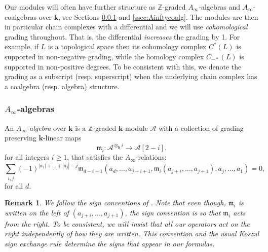 \documentclass{gtpart}
\newtheorem{rem}[thm]{Remark}
\renewcommand{\k}{\mathbf{k}}
\newcommand{\m}{\mathfrak{m}}
\newcommand{\A}{\mathscr{A}}
\renewcommand{\Z}{\mathbb{Z}}
\begin{document}
Our modules will often have further structure as $\Z$-graded $A_\infty$-algebras and $A_\infty$-coalgebras over $\k$, see Sections \ref{ssec:Ainftyalg} and \ref{ssec:Ainftycoalg}. The modules are then in particular chain complexes with a differential and we will use \emph{cohomological} grading throughout. That is, the differential \emph{increases} the grading by 1. For
example, if $L$ is a topological space then its cohomology complex $C^*(L)$ is supported in
non-negative grading, while the homology complex $C_{-*}(L)$ is supported in non-positive degrees.
To be consistent with this, we denote the grading as a subscript (resp. superscript) when the underlying chain
complex has a coalgebra (resp. algebra) structure. 


\subsubsection{$A_{\infty}$-algebras}\label{ssec:Ainftyalg} An \emph{$A_\infty$-algebra} over $\k$
is a $\Z$-graded $\k$-module $\A$ with a collection of grading preserving $\k$-linear maps \[ \m_i
\colon \A^{\otimes_\k i } \to \A [2-i],  \] for all integers $i \geq 1$, that satisfies the
$A_\infty$-relations: \begin{equation} \label{ainf} \sum_{i,j} (-1)^{|a_1|+\ldots + |a_j|-j}
\m_{d-i+1}\left(a_d,\ldots, a_{j+i+1},\m_i(a_{j+i},\ldots, a_{j+1}), a_j,\ldots, a_1\right) = 0,
\end{equation} for all $d$. 

\begin{rem}\label{rem:Seidelsign}
	We follow the sign conventions of \cite{seidelbook}. Note that
	even though, $\m_i$ is written on the left of $(a_{j+i},\ldots, a_{j+1})$, the sign
	convention is so that $\m_i$ acts from the right. To be consistent, we will insist that all our
	operators act on the right independently of how they are written. This convention and the usual
	Koszul sign exchange rule determine the signs that appear in our formulas. 
\end{rem}
\end{document}
